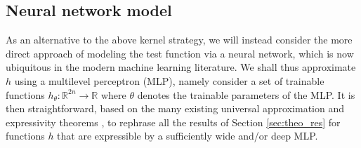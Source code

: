 \documentclass[11pt]{article}
\newcommand{\R}{\mathbb{R}}
\begin{document}
\subsection{Neural network model}
\label{sec:netw_architecture}
As an alternative to the above kernel strategy, we will instead consider the more direct approach of modeling the test function via a neural network, which is now ubiquitous in the modern machine learning literature. We shall thus approximate $h$ using a multilevel perceptron (MLP), namely consider a set of trainable functions $h_\theta:\R^{2n}\to\R$ where $\theta$ denotes the trainable parameters of the MLP. It is then straightforward, based on the many existing universal approximation and expressivity theorems \cite{hornik1989multilayer,cybenko1989approximation,haykin1994neural,lu2017expressive}, to rephrase all the results of Section \ref{sec:theo_res} for functions $h$ that are expressible by a sufficiently wide and/or deep MLP. 
\end{document}
